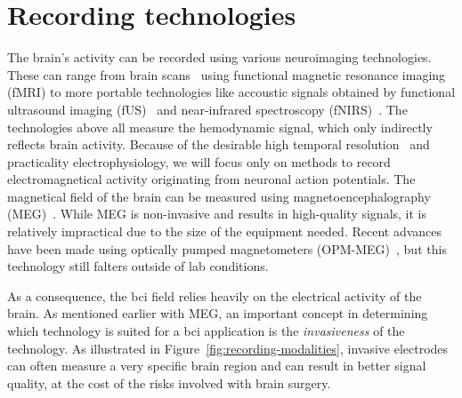 

\section{Recording technologies}
\label{sec:bci-recording}


The brain's activity can be recorded using various neuroimaging
technologies.
These can range from brain scans~\cite{Weiskopf2004} using functional magnetic resonance imaging
(fMRI) to more portable technologies like accoustic signals obtained by functional ultrasound imaging
(fUS)~\cite{Zheng2023} and near-infrared spectroscopy
(fNIRS)~\cite{Borgheai2020}.
The technologies above all measure the hemodynamic signal, which only indirectly
reflects brain activity.
Because of the desirable high temporal resolution~\cite{Easttom2021} and
practicality electrophysiology, we will focus only on methods to record
electromagnetical activity originating from neuronal action potentials.
The magnetical field of the brain can be measured using magnetoencephalography
(MEG)~\cite{Mellinger2007}.
While MEG is non-invasive and results in high-quality signals, it is relatively
impractical due to the size of the equipment needed.
Recent advances have been made using optically pumped magnetometers
(OPM-MEG)~\cite{Wittevrongel2021}, but this technology still falters outside of
lab conditions.

As a consequence, the \ac{bci} field relies heavily on the
electrical activity of the brain.
As mentioned earlier with MEG, an important concept in determining which
technology is suited for a \ac{bci} application is the \emph{invasiveness} of the technology.
As illustrated in Figure~\ref{fig:recording-modalities}, invasive electrodes can often measure a very specific brain region and can result in better signal quality, at the cost of the risks
involved with brain surgery.

